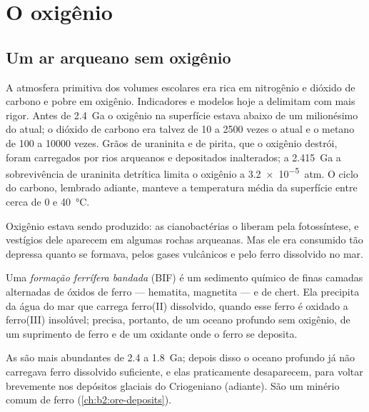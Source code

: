 \section{O oxigênio}\label{sec:b2:precambrian-earth:oxygen}

\subsection*{Um ar arqueano sem oxigênio}

A atmosfera primitiva dos volumes escolares era rica em nitrogênio e dióxido de carbono e
pobre em oxigênio. Indicadores e modelos hoje a delimitam com mais rigor. Antes de \qty{2.4}{Ga} o oxigênio
na superfície estava abaixo de um milionésimo do atual; o dióxido de carbono era talvez de 10 a 2500
vezes o atual e o metano de 100 a \num{10000} vezes. Grãos de uraninita e de pirita, que
o oxigênio destrói, foram carregados por rios arqueanos e depositados inalterados; a \qty{2.415}{Ga}
a sobrevivência de uraninita detrítica limita o oxigênio a \qty{3.2e-5}{atm}. O ciclo do carbono, lembrado
adiante, manteve a temperatura média da superfície entre cerca de 0 e \qty{40}{\celsius}.

Oxigênio estava sendo produzido: as cianobactérias o liberam pela fotossíntese, e vestígios dele aparecem em
algumas rochas arqueanas. Mas ele era consumido tão depressa quanto se formava, pelos gases vulcânicos e pelo ferro
dissolvido no mar.

\begin{definition}\label{def:b2:precambrian-earth:bif}
Uma \emph{formação ferrífera bandada} (BIF) é um sedimento químico de
finas camadas alternadas de óxidos de ferro --- hematita, magnetita --- e de chert. Ela precipita
da água do mar que carrega ferro(II) dissolvido, quando esse ferro é oxidado a
ferro(III) insolúvel; precisa, portanto, de um oceano profundo sem oxigênio, de um suprimento de ferro e de um oxidante
onde o ferro se deposita.
\end{definition}

As  são mais abundantes de 2.4 a \qty{1.8}{Ga}; depois disso o oceano profundo
já não carregava ferro dissolvido suficiente, e elas praticamente desaparecem, para voltar brevemente nos
depósitos glaciais do Criogeniano (adiante). São um minério comum de ferro
(\cref{ch:b2:ore-deposits}).

